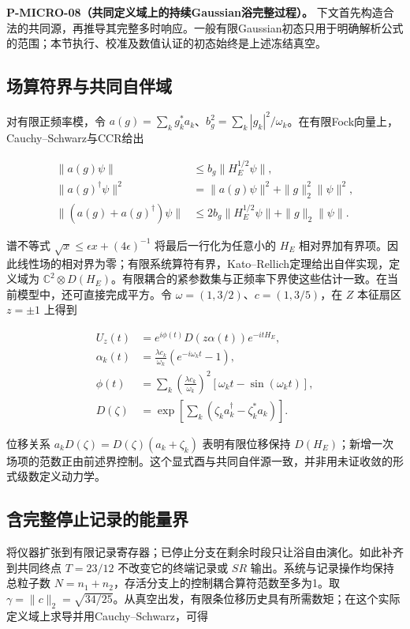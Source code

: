 \documentclass[
  11pt,
  oneside]{book}
\begin{document}
\protect\hypertarget{p-micro-08}{}{}
\textbf{P-MICRO-08（共同定义域上的持续Gaussian浴完整过程）。}
下文首先构造合法的共同源，再推导其完整多时响应。一般有限Gaussian初态只用于明确解析公式的范围；本节执行、校准及数值认证的初态始终是上述冻结真空。

\subsection{场算符界与共同自伴域}

对有限正频率模，令
\(a(g)=\sum_k g_k^*a_k\)、\(b_g^2=\sum_k|g_k|^2/\omega_k\)。在有限Fock向量上，Cauchy--Schwarz与CCR给出

\[
\begin{aligned}
\|a(g)\psi\|&\le b_g\|H_E^{1/2}\psi\|,\\
\|a(g)^\dagger\psi\|^2
&=\|a(g)\psi\|^2+\|g\|_2^2\|\psi\|^2,\\
\|(a(g)+a(g)^\dagger)\psi\|
&\le2b_g\|H_E^{1/2}\psi\|+\|g\|_2\|\psi\|.
\end{aligned}
\]

谱不等式 \(\sqrt{x}\le\epsilon x+(4\epsilon)^{-1}\)
将最后一行化为任意小的 \(H_E\)
相对界加有界项。因此线性场的相对界为零；有限系统算符有界，Kato--Rellich定理给出自伴实现，定义域为
\(\mathbb C^2\otimes D(H_E)\)。有限耦合的紧参数集与正频率下界使这些估计一致。在当前模型中，还可直接完成平方。令
\(\omega=(1,3/2)\)、\(c=(1,3/5)\)，在 \(Z\) 本征扇区 \(z=\pm1\) 上得到

\[
\begin{aligned}
U_z(t)&=e^{i\phi(t)}D(z\alpha(t))e^{-itH_E},\\
\alpha_k(t)&=\frac{\lambda c_k}{\omega_k}(e^{-i\omega_kt}-1),\\
\phi(t)&=\sum_k\left(\frac{\lambda c_k}{\omega_k}\right)^2
[\omega_kt-\sin(\omega_kt)],\\
D(\zeta)&=\exp\!\left[\sum_k(\zeta_ka_k^\dagger-\zeta_k^*a_k)\right].
\end{aligned}
\]

位移关系 \(a_kD(\zeta)=D(\zeta)(a_k+\zeta_k)\) 表明有限位移保持
\(D(H_E)\)；新增一次场项的范数正由前述界控制。这个显式酉与共同自伴源一致，并非用未证收敛的形式级数定义动力学。

\subsection{含完整停止记录的能量界}

将仪器扩张到有限记录寄存器；已停止分支在剩余时段只让浴自由演化。如此补齐到共同终点
\(T=23/12\) 不改变它的终端记录或 \(SR\)
输出。系统与记录操作均保持总粒子数
\(N=n_1+n_2\)，存活分支上的控制耦合算符范数至多为1。取
\(\gamma=\|c\|_2=\sqrt{34/25}\)。从真空出发，有限条位移历史具有所需数矩；在这个实际定义域上求导并用Cauchy--Schwarz，可得
\end{document}
